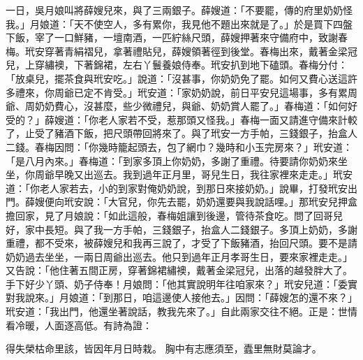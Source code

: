 \begin{showcontents}{}
一日，吳月娘叫將薛嫂兒來，與了三兩銀子。薛嫂道：「不要罷，傳的府里奶奶怪我。」月娘道：「天不使空人，多有累你，我見他不題出來就是了。」於是買下四盤下飯，宰了一口鮮豬，一壇南酒，一匹紵絲尺頭，薛嫂押著來守備府中，致謝春梅。玳安穿著青絹褶兒，拿著禮貼兒，薛嫂領著徑到後堂。春梅出來，戴著金梁冠兒，上穿繡襖，下著錦裙，左右丫鬟養娘侍奉。玳安扒到地下磕頭。春梅分付：「放桌兒，擺茶食與玳安吃。」說道：「沒甚事，你奶奶免了罷。如何又費心送這許多禮來，你周爺已定不肯受。」玳安道：「家奶奶說，前日平安兒這場事，多有累周爺、周奶奶費心，沒甚麼，些少微禮兒，與爺、奶奶賞人罷了。」春梅道：「如何好受的？」薛嫂道：「你老人家若不受，惹那頭又怪我。」春梅一面又請進守備來計較了，止受了豬酒下飯，把尺頭帶回將來了。與了玳安一方手帕，三錢銀子，抬盒人二錢。春梅因問：「你幾時籠起頭去，包了網巾？幾時和小玉完房來？」玳安道：「是八月內來。」春梅道：「到家多頂上你奶奶，多謝了重禮。待要請你奶奶來坐坐，你周爺早晚又出巡去。我到過年正月里，哥兒生日，我往家裡來走走。」玳安道：「你老人家若去，小的到家對俺奶奶說，到那日來接奶奶。」說畢，打發玳安出門。薛嫂便向玳安說：「大官兒，你先去罷，奶奶還要與我說話哩。」那玳安兒押盒擔回家，見了月娘說：「如此這般，春梅姐讓到後邊，管待茶食吃。問了回哥兒好，家中長短。與了我一方手帕，三錢銀子，抬盒人二錢銀子。多頂上奶奶，多謝重禮，都不受來，被薛嫂兒和我再三說了，才受了下飯豬酒，抬回尺頭。要不是請奶奶過去坐坐，一兩日周爺出巡去。他只到過年正月孝哥生日，要來家裡走走。」又告說：「他住著五間正房，穿著錦裙繡襖，戴著金梁冠兒，出落的越發胖大了。手下好少丫頭、奶子侍奉！月娘問：「他其實說明年往咱家來？」玳安兒道：「委實對我說來。」月娘道：「到那日，咱這邊使人接他去。」因問：「薛嫂怎的還不來？」玳安道：「我出門，他還坐著說話，教我先來了。」自此兩家交往不絕。正是：世情看冷暖，人面逐高低。有詩為證：

得失榮枯命里該，皆因年月日時栽。
胸中有志應須至，蠹里無財莫論才。



\end{showcontents}

